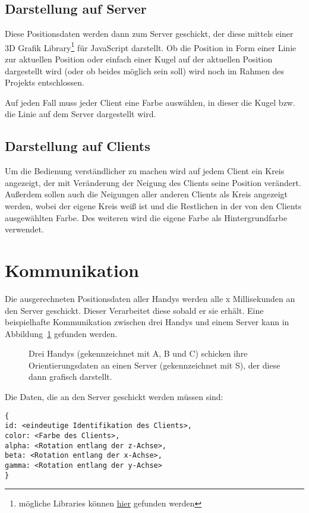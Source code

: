 ﻿\documentclass[]{article}
\begin{document}
\subsection*{Darstellung auf Server}
Diese Positionsdaten werden dann zum Server geschickt, der diese mittels einer 3D Grafik Library\footnote{mögliche Libraries können \href{https://1stwebdesigner.com/3d-javascript-libraries/}{hier} gefunden werden} für JavaScript darstellt. Ob die Position in Form einer Linie zur aktuellen Position oder einfach einer Kugel auf der aktuellen Position dargestellt wird (oder ob beides möglich sein soll) wird noch im Rahmen des Projekts entschlossen.

Auf jeden Fall muss jeder Client eine Farbe auswählen, in dieser die Kugel bzw. die Linie auf dem Server dargestellt wird.

\subsection*{Darstellung auf Clients}
Um die Bedienung verständlicher zu machen wird auf jedem Client ein Kreis angezeigt, der mit Veränderung der Neigung des Clients seine Position verändert. Außerdem sollen auch die Neigungen aller anderen Clients als Kreis angezeigt werden, wobei der eigene Kreis weiß ist und die Restlichen in der von den Clients ausgewählten Farbe. Des weiteren wird die eigene Farbe als Hintergrundfarbe verwendet.

\section*{Kommunikation}
Die ausgerechneten Positionsdaten aller Handys werden alle x Millisekunden an den Server geschickt. Dieser Verarbeitet diese sobald er sie erhält. Eine beispielhafte Kommunikation zwischen drei Handys und einem Server kann in Abbildung~\ref{fig:kommunikationsdiagramm} gefunden werden.

\begin{figure}[!h]
	\caption{Drei Handys (gekennzeichnet mit A, B und C) schicken ihre Orientierungsdaten an einen Server (gekennzeichnet mit S), der diese dann grafisch darstellt.}
	\label{fig:kommunikationsdiagramm}
\end{figure}

Die Daten, die an den Server geschickt werden müssen sind:
\begin{verbatim}
{
id: <eindeutige Identifikation des Clients>,
color: <Farbe des Clients>,
alpha: <Rotation entlang der z-Achse>,
beta: <Rotation entlang der x-Achse>,
gamma: <Rotation entlang der y-Achse>
}
\end{verbatim}
\end{document}
